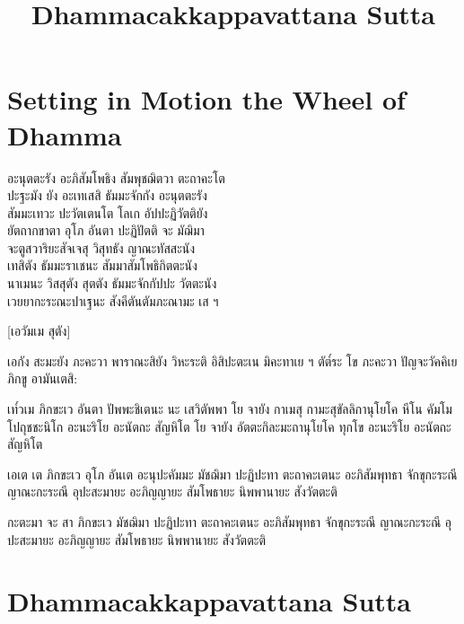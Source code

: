 \documentclass[
  babelLanguage=thai,
  final,
]{chantingbook}
\title{Dhammacakkappavattana Sutta}
\begin{document}
\mainmatter

\parittasPartSettings

\parittasChapterSettings

\chapter{Setting in Motion the Wheel of Dhamma}

\thaiText
\renewcommand{\thaiTitle}{ธัมมะจักกัปปะวัตตะนะสูตร}

\begin{leader}

อะนุตตะรัง อะภิสัมโพธิง สัมพุชฌิตวา ตะถาคะโต\\
ปะฐะมัง ยัง อะเทเสสิ ธัมมะจักกัง อะนุตตะรัง\\
สัมมะเทวะ ปะวัตเตนโต โลเก อัปปะฏิวัตติยัง\\
ยัตถากขาตา อุโภ อันตา ปะฏิปัตติ จะ มัฌิมา\\
จะตูสวาริยะสัจเจสุ วิสุทธัง ญาณะทัสสะนัง\\
เทสิตัง ธัมมะราเชนะ สัมมาสัมโพธิกิตตะนัง\\
นาเมนะ วิสสุตัง สุตตัง ธัมมะจักกัปปะ วัตตะนัง\\
เวยยากะระณะปาเฐนะ สังคีตันตัมภะณามะ เส ฯ

\end{leader}

[เอวัมเม สุตัง] 

เอกัง สะมะยัง ภะคะวา พาราณะสิยัง วิหะระติ อิสิปะตะเน
มิคะทาเย ฯ ตัต๎ระ โข ภะคะวา ปัญจะวัคคิเย ภิกขู อามันเตสิ:

เท๎วเม ภิกขะเว อันตา ปัพพะชิเตนะ นะ เสวิตัพพา โย จายัง กาเมสุ
กามะสุขัลลิกานุโยโค หีโน คัมโม โปถุชชะนิโก อะนะริโย อะนัตถะ
สัญหิโต โย จายัง อัตตะกิละมะถานุโยโค ทุกโข อะนะริโย อะนัตถะสัญหิโต

เอเต เต ภิกขะเว อุโภ อันเต อะนุปะคัมมะ มัชฌิมา ปะฏิปะทา ตะถาคะเตนะ อะภิสัมพุทธา
จักขุกะระณี ญาณะกะระณี อุปะสะมายะ อะภิญญายะ สัมโพธายะ นิพพานายะ สังวัตตะติ

กะตะมา จะ สา ภิกขะเว มัชฌิมา ปะฏิปะทา ตะถาคะเตนะ อะภิสัมพุทธา จักขุกะระณี
ญาณะกะระณี อุปะสะมายะ อะภิญญายะ สัมโพธายะ นิพพานายะ สังวัตตะติ

\chapter{Dhammacakkappavattana Sutta}%

\paliText
\renewcommand{\paliTitle}{Dhammacakkappavattana Sutta}
\end{document}

